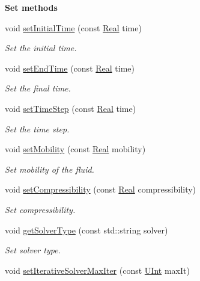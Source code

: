 \begin{Indent}{\bf Set methods}
\begin{DoxyCompactItemize}
void \hyperlink{classFVCode3D_1_1Data_a07b180c02fcd985f9f75b662e00ad54e}{set\+Initial\+Time} (const \hyperlink{namespaceFVCode3D_a40c1f5588a248569d80aa5f867080e83}{Real} time)
\begin{DoxyCompactList}\small\item\em Set the initial time. \end{DoxyCompactList}\item 
void \hyperlink{classFVCode3D_1_1Data_a551add51bd5facc5afa37956eb3e8187}{set\+End\+Time} (const \hyperlink{namespaceFVCode3D_a40c1f5588a248569d80aa5f867080e83}{Real} time)
\begin{DoxyCompactList}\small\item\em Set the final time. \end{DoxyCompactList}\item 
void \hyperlink{classFVCode3D_1_1Data_a57ad8c8edd71c60b60a0ad9296171c4a}{set\+Time\+Step} (const \hyperlink{namespaceFVCode3D_a40c1f5588a248569d80aa5f867080e83}{Real} time)
\begin{DoxyCompactList}\small\item\em Set the time step. \end{DoxyCompactList}\item 
void \hyperlink{classFVCode3D_1_1Data_a5fb85e6447083d24572761d79f1c4f72}{set\+Mobility} (const \hyperlink{namespaceFVCode3D_a40c1f5588a248569d80aa5f867080e83}{Real} mobility)
\begin{DoxyCompactList}\small\item\em Set mobility of the fluid. \end{DoxyCompactList}\item 
void \hyperlink{classFVCode3D_1_1Data_a51500d24b2200a3e60e53f0d55750fbb}{set\+Compressibility} (const \hyperlink{namespaceFVCode3D_a40c1f5588a248569d80aa5f867080e83}{Real} compressibility)
\begin{DoxyCompactList}\small\item\em Set compressibility. \end{DoxyCompactList}\item 
void \hyperlink{classFVCode3D_1_1Data_adbc56dcf8d9718df3d918565ddea304b}{get\+Solver\+Type} (const std\+::string solver)
\begin{DoxyCompactList}\small\item\em Set solver type. \end{DoxyCompactList}\item 
void \hyperlink{classFVCode3D_1_1Data_aa88334bcae4148d0108e0f37b3b21730}{set\+Iterative\+Solver\+Max\+Iter} (const \hyperlink{namespaceFVCode3D_a4bf7e328c75d0fd504050d040ebe9eda}{U\+Int} max\+It)

\end{DoxyCompactItemize}
\end{Indent}
